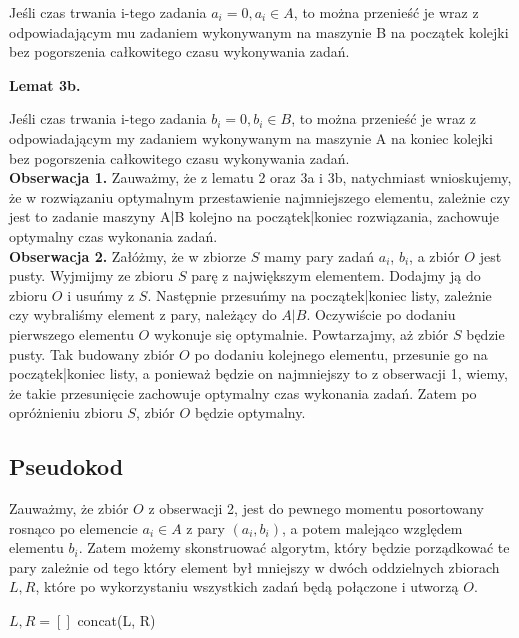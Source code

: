 \documentclass[11pt, wide]{article}
\begin{document}
    Jeśli czas trwania i-tego zadania $a_i = 0, a_i \in A$, to można przenieść je wraz z 
    odpowiadającym mu zadaniem wykonywanym na maszynie B na początek kolejki bez pogorszenia całkowitego czasu wykonywania zadań.
    
    
    \textbf{Lemat 3b.}

    Jeśli czas trwania i-tego zadania $b_i = 0, b_i \in B$, to można przenieść je wraz z 
    odpowiadającym my zadaniem wykonywanym na maszynie A na koniec kolejki bez pogorszenia całkowitego czasu wykonywania zadań.
    \\

    \textbf{Obserwacja 1.}
    Zauważmy, że z lematu 2 oraz 3a i 3b, natychmiast wnioskujemy, że w rozwiązaniu optymalnym przestawienie 
    najmniejszego elementu, zależnie czy jest to zadanie maszyny A|B kolejno na początek|koniec rozwiązania, zachowuje
    optymalny czas wykonania zadań.
    \\

    \textbf{Obserwacja 2.}
    Załóżmy, że w zbiorze $S$ mamy pary zadań $a_i$, $b_i$, a zbiór $O$ jest pusty. Wyjmijmy ze zbioru $S$ parę z największym elementem.
    Dodajmy ją do zbioru $O$ i usuńmy z $S$. Następnie przesuńmy na początek|koniec listy, zależnie czy wybraliśmy element z pary, należący do $A|B$.
    Oczywiście po dodaniu pierwszego elementu $O$ wykonuje się optymalnie. Powtarzajmy, aż zbiór $S$ będzie pusty. 
    Tak budowany zbiór $O$ po dodaniu kolejnego elementu, przesunie go na początek|koniec listy,
    a ponieważ będzie on najmniejszy to z obserwacji 1, wiemy, że takie przesunięcie zachowuje optymalny czas wykonania zadań. 
    Zatem po opróżnieniu zbioru $S$, zbiór $O$ będzie optymalny.

    \subsection{Pseudokod}

    Zauważmy, że zbiór $O$ z obserwacji 2, jest do pewnego momentu posortowany
    rosnąco po elemencie $a_i \in A$ z pary $(a_i, b_i)$, a potem malejąco względem
    elementu $b_i$. Zatem możemy skonstruować algorytm, który będzie porządkować te 
    pary zależnie od tego który element był mniejszy w dwóch oddzielnych zbiorach $L, R$,
    które po wykorzystaniu wszystkich zadań będą połączone i utworzą $O$.


    \begin{algorithm}[H]
     $L,R = []$\;
     \Return concat(L, R)
    \end{algorithm}
    
\end{document}
